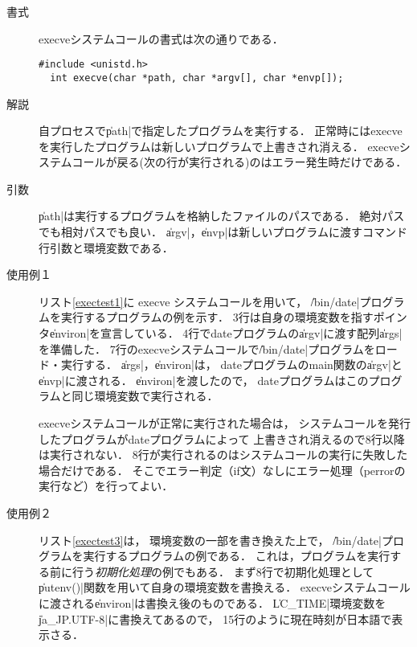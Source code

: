 \begin{description}
\item[書式] execveシステムコールの書式は次の通りである．
\begin{lstlisting}[numbers=none]
  #include <unistd.h>
  int execve(char *path, char *argv[], char *envp[]);
\end{lstlisting}

\item[解説]
  自プロセスで\|path|で指定したプログラムを実行する．
  正常時にはexecveを実行したプログラムは新しいプログラムで上書きされ消える．
  execveシステムコールが戻る(次の行が実行される)のはエラー発生時だけである．

\item[引数]
  \|path|は実行するプログラムを格納したファイルのパスである．
  絶対パスでも相対パスでも良い．
  \|argv|，\|envp|は新しいプログラムに渡すコマンド行引数と環境変数である．

\item[使用例１]
  リスト\ref{exectest1}に execve システムコールを用いて，
  \|/bin/date|プログラムを実行するプログラムの例を示す．
  3行は自身の環境変数を指すポインタ\|environ|を宣言している．
  4行でdateプログラムの\|argv|に渡す配列\|args|を準備した．
  7行のexecveシステムコールで\|/bin/date|プログラムをロード・実行する．
  \|args|，\|environ|は，
  dateプログラムのmain関数の\|argv|と\|envp|に渡される．
  \|environ|を渡したので，
  dateプログラムはこのプログラムと同じ環境変数で実行される．

  execveシステムコールが正常に実行された場合は，
  システムコールを発行したプログラムがdateプログラムによって
  上書きされ消えるので8行以降は実行されない．
  8行が実行されるのはシステムコールの実行に失敗した場合だけである．
  そこでエラー判定（if文）なしにエラー処理（perrorの実行など）を行ってよい．

  

\item[使用例２]
  リスト\ref{exectest3}は，
  環境変数の一部を書き換えた上で，
  \|/bin/date|プログラムを実行するプログラムの例である．
  これは，プログラムを実行する前に行う\emph{初期化処理}の例でもある．
  まず8行で初期化処理として\|putenv()|関数を用いて自身の環境変数を書換える．
  execveシステムコールに渡される\|environ|は書換え後のものである．
  \|LC_TIME|環境変数を\|ja_JP.UTF-8|に書換えてあるので，
  15行のように現在時刻が日本語で表示さる．

  


\end{description}
